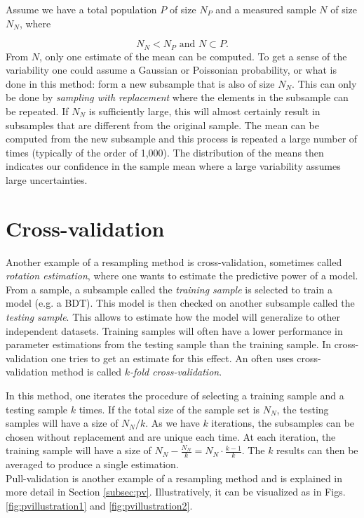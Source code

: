 \begin{appendices}
Assume we have a total population $P$ of size $N_P$ and a measured sample $N$ of size $N_N$, where 

\begin{equation}
N_N < N_P \textrm{ and } N \subset P.
\end{equation}
From $N$, only one estimate of the mean can be computed. To get a sense of the variability one could assume a Gaussian or Poissonian probability, or what is done in this method: form a new subsample that is also of size $N_N$. This can only be done by \textit{sampling with replacement} where the elements in the subsample can be repeated. If $N_N$ is sufficiently large, this will almost certainly result in subsamples that are different from the original sample. The mean can be computed from the new subsample and this process is repeated a large number of times (typically of the order of 1,000). The distribution of the means then indicates our confidence in the sample mean where a large variability assumes large uncertainties.

\section{Cross-validation}
Another example of a resampling method is cross-validation, sometimes called \textit{rotation estimation}, where one wants to estimate the predictive power of a model. From a sample, a subsample called the \textit{training sample} is selected to train a model (e.g. a BDT). This model is then checked on another subsample called the \textit{testing sample}. This allows to estimate how the model will generalize to other independent datasets. Training samples will often have a lower performance in parameter estimations from the testing sample than the training sample. In cross-validation one tries to get an estimate for this effect. An often uses cross-validation method is called \textit{$k$-fold cross-validation}.

In this method, one iterates the procedure of selecting a training sample and a testing sample $k$ times. If the total size of the sample set is $N_N$, the testing samples will have a size of $N_N/k$. As we have $k$ iterations, the subsamples can be chosen without replacement and are unique each time. At each iteration, the training sample will have a size of $N_N - \frac{N_N}{k} = N_N \cdot \frac{k-1}{k}$. The $k$ results can then be averaged to produce a single estimation.\\

\noindent Pull-validation is another example of a resampling method and is explained in more detail in Section \ref{subsec:pv}. Illustratively, it can be visualized as in Figs. \ref{fig:pvillustration1} and \ref{fig:pvillustration2}.


\end{appendices}
